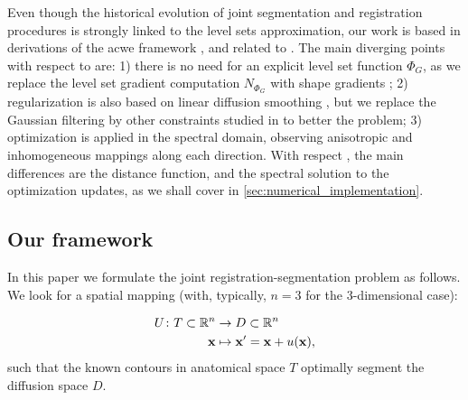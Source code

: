 Even though the historical evolution
of joint segmentation and registration procedures is strongly linked
to the level sets approximation, our work is based in derivations of
the \gls{acwe} framework \citep{chan_active_2001}, and related to
\citep{guyader_combined_2011}.
{\color{red} {The main diverging points with respect to
\citep{gorthi_active_2011} are: 1) there is no need for an explicit level set function
$\Phi_G$, as we replace the level set gradient computation $N_{\Phi_G}$ with shape
gradients \citep{besson_dream2s_2003,herbulot_segmentation_2006};
2) regularization is also based on linear diffusion smoothing \citep{thirion_image_1998},
but we replace the Gaussian filtering by other constraints
studied in \citep{nagel_investigation_1986} to better the problem;
3) optimization is applied in the spectral
domain, observing anisotropic and inhomogeneous mappings along each direction.
With respect \citep{guyader_combined_2011}, the main differences are
the distance function, and the spectral solution to the optimization updates,
as we shall cover in \autoref{sec:numerical_implementation}.}}


\subsection{Our framework}
\label{sec:our_framework}

In this paper we formulate the joint registration-segmentation
problem as follows. We look for a spatial mapping (with, typically,
$n=3$ for the 3-dimensional case):

\begin{align}
U\colon T \subset \mathbb{R}^n &\to D \subset \mathbb{R}^n \notag\\
\vec{x} &\mapsto \vec{x}' =\vec{x}+u(\vec{x}),
\label{eq:transform}
\end{align}
such that the known contours in anatomical space $T$ optimally segment
the diffusion space $D$.


